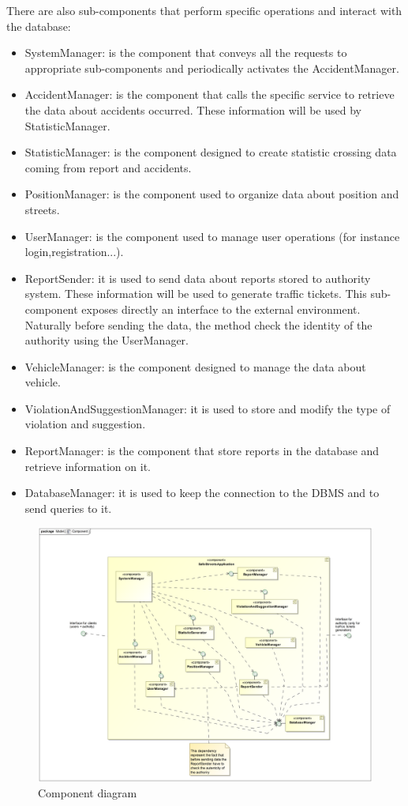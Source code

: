 There are also sub-components that perform specific operations and interact with the database:
\begin{itemize}
 \item 
 SystemManager: is the component that conveys all the requests to appropriate sub-components and periodically activates the AccidentManager.
 \item 
 AccidentManager: is the component that calls the specific service to retrieve the data about accidents occurred. These information will be used by StatisticManager.
 \item
 StatisticManager: is the component designed to create statistic crossing data coming from report and accidents.
 \item 
 PositionManager: is the component used to organize data about position and streets.
 \item 
 UserManager: is the component used to manage user operations (for instance login,registration...).
 \item
 ReportSender: it is used to send data about reports stored to authority system. These information will be used to generate traffic tickets. This sub-component exposes directly an interface to the external environment. Naturally before sending the data, the method check the identity of the authority using the UserManager.
 \item 
 VehicleManager: is the component designed to manage the data about vehicle.
 \item 
 ViolationAndSuggestionManager: it is used to store and modify the type of violation and suggestion.
 \item 
 ReportManager: is the component that store reports in the database and retrieve information on it.
 \item 
 DatabaseManager: it is used to keep the connection to the DBMS and to send queries to it.
\end{itemize}


\begin{figure}[H]
	\centering
	\includegraphics[width=1.12\linewidth]{Images/component.png}
	\caption{Component diagram}
\end{figure}

